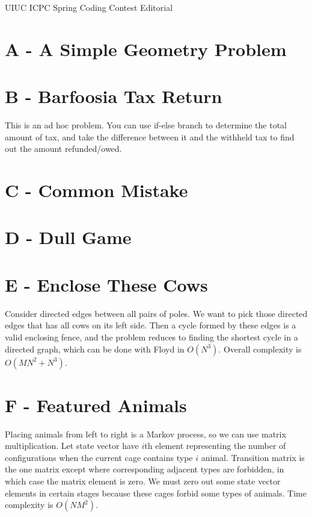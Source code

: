 \documentclass{article}
\begin{document}
UIUC ICPC Spring Coding Contest Editorial

\section{A - A Simple Geometry Problem}



\section{B - Barfoosia Tax Return}

This is an ad hoc problem. You can use if-else branch to determine the total amount of tax, and take the difference between it and the withheld tax to find out the amount refunded/owed. 

\section{C - Common Mistake}



\section{D - Dull Game}



\section{E - Enclose These Cows}

Consider directed edges between all pairs of poles. We want to pick those directed edges that has all cows on its left side. Then a cycle formed by these edges is a valid enclosing fence, and the problem reduces to finding the shortest cycle in a directed graph, which can be done with Floyd in $O(N^3)$. Overall complexity is $O(M N^2 + N^3)$. 

\section{F - Featured Animals}

Placing animals from left to right is a Markov process, so we can use matrix multiplication. Let state vector have $i$th element representing the number of configurations when the current cage contains type $i$ animal. Transition matrix is the one matrix except where corresponding adjacent types are forbidden, in which case the matrix element is zero. We must zero out some state vector elements in certain stages because these cages forbid some types of animals. Time complexity is $O(N M^2)$. 
\end{document}
